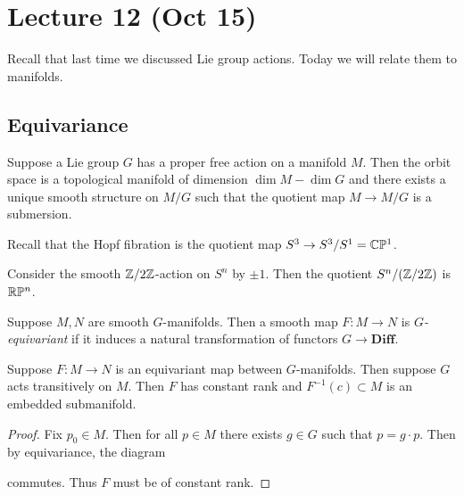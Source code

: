 \documentclass[twoside, 10pt]{article}
\begin{document}
    \section{Lecture 12 (Oct 15)}%
    \label{sec:lecture_12_oct_15_}

    Recall that last time we discussed Lie group actions. Today we will relate them to manifolds.

    \subsection{Equivariance}%
    \label{sub:equivariance}
    
    

    \begin{thm}
        Suppose a Lie group $G$ has a proper free action on a manifold $M$. Then the orbit space is a topological manifold of dimension $\dim M - \dim G$ and there exists a unique smooth structure on $M/G$ such that the quotient map $M \to M/G$ is a submersion.
    \end{thm}

    \begin{exm}
        Recall that the Hopf fibration is the quotient map $S^3 \to S^3/S^1 = \mathbb{C}\mathbb{P}^1$.
    \end{exm}

    \begin{exm}
        Consider the smooth $\mathbb{Z}/2\mathbb{Z}$-action on $S^n$ by $\pm 1$. Then the quotient $S^n/(\mathbb{Z}/2\mathbb{Z})$ is $\mathbb{R}\mathbb{P}^n$.
    \end{exm}
    
    \begin{defn}
        Suppose $M, N$ are smooth $G$-manifolds. Then a smooth map $F:M \to N$ is \textit{$G$-equivariant} if it induces a natural transformation of functors $G \to \mathbf{Diff}$.
    \end{defn}    
    
    \begin{thm}
        Suppose $F:M \to N$ is an equivariant map between $G$-manifolds. Then suppose $G$ acts transitively on $M$. Then $F$ has constant rank and $F^{-1}(c) \subset M$ is an embedded submanifold.
    \end{thm}

    \begin{proof}
        Fix $p_0 \in M$. Then for all $p \in M$ there exists $g \in G$ such that $p = g \cdot p$. Then by equivariance, the diagram
        \begin{center}
        \end{center}
        commutes. Thus $F$ must be of constant rank.
    \end{proof}
\end{document}
